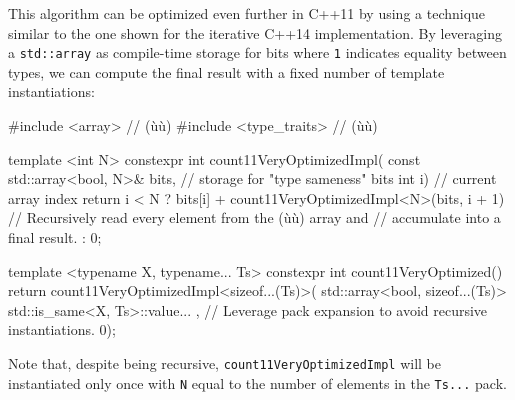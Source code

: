 \noindent This algorithm can be optimized even further in C++11 by using
a technique similar to the one shown for the iterative C++14
implementation. By leveraging a \lstinline!std::array! as compile-time
storage for bits where \lstinline!1! indicates equality between types, we can compute the final result with a fixed number of template
instantiations:

\begin{emcppslisting}
#include <array>        // (ù{}ù)
#include <type_traits>  // (ù{}ù)

template <int N>
constexpr int count11VeryOptimizedImpl(
    const std::array<bool, N>& bits,  // storage for "type sameness" bits
    int i)                            // current array index
{
    return i < N
        ? bits[i] + count11VeryOptimizedImpl<N>(bits, i + 1)
            // Recursively read every element from the (ù{}ù) array and
            // accumulate into a final result.
        : 0;
}

template <typename X, typename... Ts>
constexpr int count11VeryOptimized()
{
    return count11VeryOptimizedImpl<sizeof...(Ts)>(
        std::array<bool, sizeof...(Ts)>{ std::is_same<X, Ts>::value... },
            // Leverage pack expansion to avoid recursive instantiations.
        0);
}
\end{emcppslisting}
    
\noindent Note that, despite being recursive, \lstinline!count11VeryOptimizedImpl!
will be instantiated only once with \lstinline!N! equal to the number of
elements in the \lstinline!Ts...! pack.



